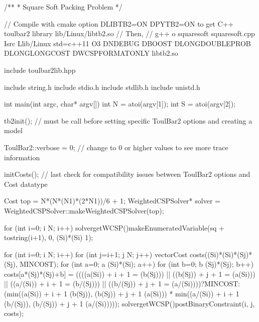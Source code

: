 \documentclass[letterpaper,10pt,openany,oneside,english]{sphinxmanual}
\begin{document}
\begin{sphinxVerbatim}[commandchars=\\\{\}]

/**
 * Square Soft Packing Problem
 */

// Compile with cmake option \PYGZhy{}DLIBTB2=ON \PYGZhy{}DPYTB2=ON to get C++ toulbar2 library lib/Linux/libtb2.so
// Then,
// g++ \PYGZhy{}o squaresoft squaresoft.cpp \PYGZhy{}Isrc \PYGZhy{}Llib/Linux \PYGZhy{}std=c++11 \PYGZhy{}O3 \PYGZhy{}DNDEBUG \PYGZhy{}DBOOST \PYGZhy{}DLONGDOUBLE\PYGZus{}PROB \PYGZhy{}DLONGLONG\PYGZus{}COST \PYGZhy{}DWCSPFORMATONLY libtb2.so

\PYGZsh{}include \PYGZdq{}toulbar2lib.hpp\PYGZdq{}

\PYGZsh{}include \PYGZlt{}string.h\PYGZgt{}
\PYGZsh{}include \PYGZlt{}stdio.h\PYGZgt{}
\PYGZsh{}include \PYGZlt{}stdlib.h\PYGZgt{}
\PYGZsh{}include \PYGZlt{}unistd.h\PYGZgt{}

int main(int argc, char* argv[])
\PYGZob{}
    int N = atoi(argv[1]);
    int S = atoi(argv[2]);

    tb2init(); // must be call before setting specific ToulBar2 options and creating a model

    ToulBar2::verbose = 0; // change to 0 or higher values to see more trace information

    initCosts(); // last check for compatibility issues between ToulBar2 options and Cost data\PYGZhy{}type

    Cost top = N*(N*(N\PYGZhy{}1)*(2*N\PYGZhy{}1))/6 + 1;
    WeightedCSPSolver* solver = WeightedCSPSolver::makeWeightedCSPSolver(top);

    for (int i=0; i \PYGZlt{} N; i++) \PYGZob{}
        solver\PYGZhy{}\PYGZgt{}getWCSP()\PYGZhy{}\PYGZgt{}makeEnumeratedVariable(\PYGZdq{}sq\PYGZdq{} + to\PYGZus{}string(i+1), 0, (S\PYGZhy{}i)*(S\PYGZhy{}i) \PYGZhy{} 1);
    \PYGZcb{}

    for (int i=0; i \PYGZlt{} N; i++) \PYGZob{}
        for (int j=i+1; j \PYGZlt{} N; j++) \PYGZob{}
            vector\PYGZlt{}Cost\PYGZgt{} costs((S\PYGZhy{}i)*(S\PYGZhy{}i)*(S\PYGZhy{}j)*(S\PYGZhy{}j), MIN\PYGZus{}COST);
    	    for (int a=0; a \PYGZlt{} (S\PYGZhy{}i)*(S\PYGZhy{}i); a++) \PYGZob{}
    	        for (int b=0; b \PYGZlt{} (S\PYGZhy{}j)*(S\PYGZhy{}j); b++) \PYGZob{}
                    costs[a*(S\PYGZhy{}j)*(S\PYGZhy{}j)+b] = ((((a\PYGZpc{}(S\PYGZhy{}i)) + i + 1 \PYGZlt{}= (b\PYGZpc{}(S\PYGZhy{}j))) || ((b\PYGZpc{}(S\PYGZhy{}j)) + j + 1 \PYGZlt{}= (a\PYGZpc{}(S\PYGZhy{}i))) || ((a/(S\PYGZhy{}i)) + i + 1 \PYGZlt{}= (b/(S\PYGZhy{}j))) || ((b/(S\PYGZhy{}j)) + j + 1 \PYGZlt{}= (a/(S\PYGZhy{}i))))?MIN\PYGZus{}COST:(min((a\PYGZpc{}(S\PYGZhy{}i)) + i + 1 \PYGZhy{} (b\PYGZpc{}(S\PYGZhy{}j)), (b\PYGZpc{}(S\PYGZhy{}j)) + j + 1 \PYGZhy{} (a\PYGZpc{}(S\PYGZhy{}i))) * min((a/(S\PYGZhy{}i)) + i + 1 \PYGZhy{} (b/(S\PYGZhy{}j)), (b/(S\PYGZhy{}j)) + j + 1 \PYGZhy{} (a/(S\PYGZhy{}i)))));
                \PYGZcb{}
            \PYGZcb{}
            solver\PYGZhy{}\PYGZgt{}getWCSP()\PYGZhy{}\PYGZgt{}postBinaryConstraint(i, j, costs);
        \PYGZcb{}
    \PYGZcb{}


\end{sphinxVerbatim}
\end{document}
